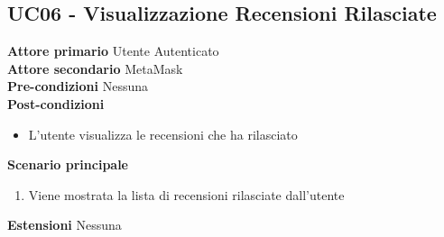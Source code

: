 \subsection{UC06 - Visualizzazione Recensioni Rilasciate}
\textbf{Attore primario} Utente Autenticato \\
\textbf{Attore secondario} MetaMask \\
\textbf{Pre-condizioni} Nessuna \\
\textbf{Post-condizioni}
\begin{itemize}
    \item L'utente visualizza le recensioni che ha rilasciato
\end{itemize}
\textbf{Scenario principale}
\begin{enumerate}
    \item Viene mostrata la lista di recensioni rilasciate dall'utente
\end{enumerate}
\textbf{Estensioni}
Nessuna
